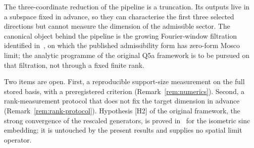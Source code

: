 \documentclass[11pt,a4paper]{article}
\theoremstyle{plain}
\theoremstyle{definition}
\begin{document}
  The three-coordinate reduction of the pipeline is a truncation.
  Its outputs live in a subspace fixed in advance, so they can characterise the first
  three selected directions but cannot measure the dimension of the admissible sector.
  The canonical object behind the pipeline is the growing Fourier-window filtration
  identified in~\cite{Beau2026q5a}, on which the published admissibility form has
  zero-form Mosco limit; the analytic programme of the original Q5a framework is to be
  pursued on that filtration, not through a fixed finite rank.

  Two items are open.
  First, a reproducible support-size measurement on the full stored basis, with a
  preregistered criterion (Remark~\ref{rem:numerics}).
  Second, a rank-measurement protocol that does not fix the target dimension in advance
  (Remark~\ref{rem:rank-protocol}).
  Hypothesis [H2] of the original framework, the strong convergence of the rescaled
  generators, is proved in~\cite{Beau2026h2} for the isometric sinc embedding; it is untouched
  by the present results and supplies no spatial limit operator.

  \newpage
  
  
\end{document}
